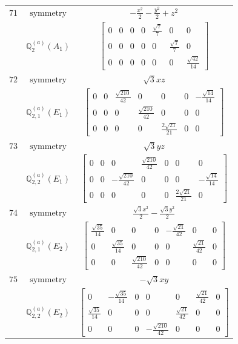 \documentclass[fleqn,8pt,landscape]{jsarticle}
\begin{document}
\begin{longtable}{ccc}
$ 71 $ & $ \text{symmetry} $ & $ - \frac{x^{2}}{2} - \frac{y^{2}}{2} + z^{2} $ \\
$  $ & $ \mathbb{Q}_{2}^{(a)}(A_{1}) $ & $ \begin{bmatrix} 0 & 0 & 0 & 0 & \frac{\sqrt{7}}{7} & 0 & 0 \\ 0 & 0 & 0 & 0 & 0 & \frac{\sqrt{7}}{7} & 0 \\ 0 & 0 & 0 & 0 & 0 & 0 & \frac{\sqrt{42}}{14} \end{bmatrix} $ \\ \hline
$ 72 $ & $ \text{symmetry} $ & $ \sqrt{3} x z $ \\
$  $ & $ \mathbb{Q}_{2,1}^{(a)}(E_{1}) $ & $ \begin{bmatrix} 0 & 0 & \frac{\sqrt{210}}{42} & 0 & 0 & 0 & - \frac{\sqrt{14}}{14} \\ 0 & 0 & 0 & \frac{\sqrt{210}}{42} & 0 & 0 & 0 \\ 0 & 0 & 0 & 0 & \frac{2 \sqrt{21}}{21} & 0 & 0 \end{bmatrix} $ \\ \hline
$ 73 $ & $ \text{symmetry} $ & $ \sqrt{3} y z $ \\
$  $ & $ \mathbb{Q}_{2,2}^{(a)}(E_{1}) $ & $ \begin{bmatrix} 0 & 0 & 0 & \frac{\sqrt{210}}{42} & 0 & 0 & 0 \\ 0 & 0 & - \frac{\sqrt{210}}{42} & 0 & 0 & 0 & - \frac{\sqrt{14}}{14} \\ 0 & 0 & 0 & 0 & 0 & \frac{2 \sqrt{21}}{21} & 0 \end{bmatrix} $ \\ \hline
$ 74 $ & $ \text{symmetry} $ & $ \frac{\sqrt{3} x^{2}}{2} - \frac{\sqrt{3} y^{2}}{2} $ \\
$  $ & $ \mathbb{Q}_{2,1}^{(a)}(E_{2}) $ & $ \begin{bmatrix} \frac{\sqrt{35}}{14} & 0 & 0 & 0 & - \frac{\sqrt{21}}{42} & 0 & 0 \\ 0 & \frac{\sqrt{35}}{14} & 0 & 0 & 0 & \frac{\sqrt{21}}{42} & 0 \\ 0 & 0 & \frac{\sqrt{210}}{42} & 0 & 0 & 0 & 0 \end{bmatrix} $ \\ \hline
$ 75 $ & $ \text{symmetry} $ & $ - \sqrt{3} x y $ \\
$  $ & $ \mathbb{Q}_{2,2}^{(a)}(E_{2}) $ & $ \begin{bmatrix} 0 & - \frac{\sqrt{35}}{14} & 0 & 0 & 0 & \frac{\sqrt{21}}{42} & 0 \\ \frac{\sqrt{35}}{14} & 0 & 0 & 0 & \frac{\sqrt{21}}{42} & 0 & 0 \\ 0 & 0 & 0 & - \frac{\sqrt{210}}{42} & 0 & 0 & 0 \end{bmatrix} $ \\ \hline

\end{longtable}
\end{document}
